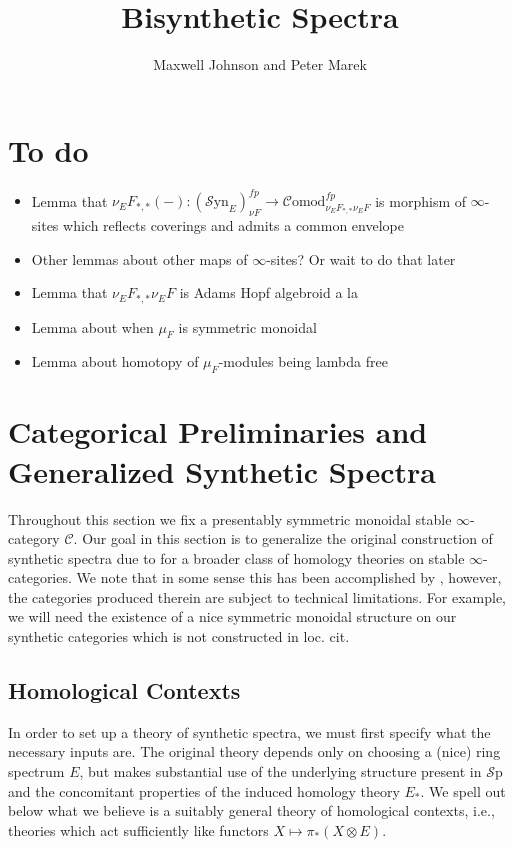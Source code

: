\documentclass[10pt]{amsart}
\theoremstyle{definition}
\numberwithin{figure}{section}
\numberwithin{equation}{section}
\newcommand{\cC}{\mathcal{C}}
\theoremstyle{cited}
\newcommand{\Sp}{{\mathcal{S}\mathrm{p}}}
\newcommand{\Syn}{\mathcal{S}\mathrm{yn}}
\newcommand{\Comod}{\mathcal{C}\mathrm{omod}}
\begin{document}
\title{Bisynthetic Spectra}
\author{Maxwell Johnson and Peter Marek}

\maketitle

\section*{To do}
\begin{itemize}
    \item Lemma that $\nu_EF_{*,*}(-):(\Syn_E)_{\nu F}^{fp}\to\Comod_{\nu_EF_{*,*}\nu_EF}^{fp}$ is morphism of $\infty$-sites which reflects coverings and admits a common envelope
    \item Other lemmas about other maps of $\infty$-sites? Or wait to do that later
    \item Lemma that $\nu_EF_{*,*}\nu_EF$ is Adams Hopf algebroid a la \cite[Def. 3.1]{Pst22}
    \item Lemma about when $\mu_F$ is symmetric monoidal
    \item Lemma about homotopy of $\mu_F$-modules being lambda free
\end{itemize}

\tableofcontents


\section{Categorical Preliminaries and Generalized Synthetic Spectra}

Throughout this section we fix a presentably symmetric monoidal stable $\infty$-category $\cC$. Our goal in this section is to generalize the original construction of synthetic spectra due to \cite{Pst22} for a broader class of homology theories on stable $\infty$-categories. We note that in some sense this has been accomplished by \cite{PP23}, however, the categories produced therein are subject to technical limitations. For example, we will need the existence of a nice symmetric monoidal structure on our synthetic categories which is not constructed in loc. cit.

\subsection{Homological Contexts} In order to set up a theory of synthetic spectra, we must first specify what the necessary inputs are. The original theory depends only on choosing a (nice) ring spectrum $E$, but makes substantial use of the underlying structure present in $\Sp$ and the concomitant properties of the induced homology theory $E_*$. We spell out below what we believe is a suitably general theory of homological contexts, i.e., theories which act sufficiently like functors $X\mapsto \pi_*(X\otimes E)$.
\end{document}
